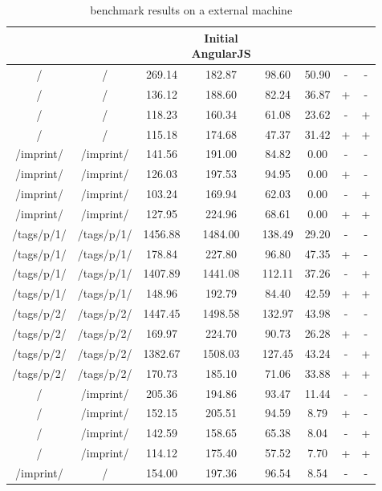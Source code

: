 \begin{appendix}
\begin{center}
\footnotesize
\begin{longtable}{cccccccc}
    \caption{\selenium{} benchmark results on a external machine}
    \\
	\hline
	\thead{From} & \thead{To} & \thead{Common} & \thead{Initial\\AngularJS} & \thead{\lare{}} & \thead{AngularJS} &  \thead{DC} & \thead{TC} \\
\hline
/ & / & 269.14 & 182.87 & 98.60 & 50.90 & - & - \\
/ & / & 136.12 & 188.60 & 82.24 & 36.87 & + & - \\
/ & / & 118.23 & 160.34 & 61.08 & 23.62 & - & + \\
/ & / & 115.18 & 174.68 & 47.37 & 31.42 & + & + \\
\hline
/imprint/ & /imprint/ & 141.56 & 191.00 & 84.82 & 0.00 & - & - \\
/imprint/ & /imprint/ & 126.03 & 197.53 & 94.95 & 0.00 & + & - \\
/imprint/ & /imprint/ & 103.24 & 169.94 & 62.03 & 0.00 & - & + \\
/imprint/ & /imprint/ & 127.95 & 224.96 & 68.61 & 0.00 & + & + \\
\hline
/tags/p/1/ & /tags/p/1/ & 1456.88 & 1484.00 & 138.49 & 29.20 & - & - \\
/tags/p/1/ & /tags/p/1/ & 178.84 & 227.80 & 96.80 & 47.35 & + & - \\
/tags/p/1/ & /tags/p/1/ & 1407.89 & 1441.08 & 112.11 & 37.26 & - & + \\
/tags/p/1/ & /tags/p/1/ & 148.96 & 192.79 & 84.40 & 42.59 & + & + \\
\hline
/tags/p/2/ & /tags/p/2/ & 1447.45 & 1498.58 & 132.97 & 43.98 & - & - \\
/tags/p/2/ & /tags/p/2/ & 169.97 & 224.70 & 90.73 & 26.28 & + & - \\
/tags/p/2/ & /tags/p/2/ & 1382.67 & 1508.03 & 127.45 & 43.24 & - & + \\
/tags/p/2/ & /tags/p/2/ & 170.73 & 185.10 & 71.06 & 33.88 & + & + \\
\hline
\hline
/ & /imprint/ & 205.36 & 194.86 & 93.47 & 11.44 & - & - \\
/ & /imprint/ & 152.15 & 205.51 & 94.59 & 8.79 & + & - \\
/ & /imprint/ & 142.59 & 158.65 & 65.38 & 8.04 & - & + \\
/ & /imprint/ & 114.12 & 175.40 & 57.52 & 7.70 & + & + \\
\hline
/imprint/ & / & 154.00 & 197.36 & 96.54 & 8.54 & - & - \\

\end{longtable}
\end{center}
\end{appendix}
